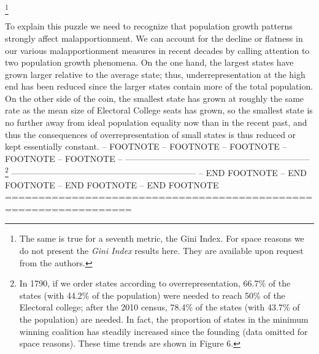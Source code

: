         \footnote{The same is true for a seventh metric, the Gini Index. For space reasons we do not present the \textit{Gini Index} results here. They are available upon request from the authors.}
    
To explain this puzzle we need to recognize that population growth patterns strongly affect malapportionment. We can account for the decline or flatness in our various malapportionment measures in recent decades by calling attention to two population growth phenomena.  On the one hand, the largest states have grown larger relative to the average state; thus, underrepresentation at the high end has been reduced since the larger states contain more of the total population.  On the other side of the coin, the smallest state has grown at roughly the same rate as the mean size of Electoral College seats has grown, so the smallest state is no further away from ideal population equality now than in the recent past, and thus the consequences of overrepresentation of small states is thus reduced or kept essentially constant. 
-- FOOTNOTE -- FOOTNOTE -- FOOTNOTE -- FOOTNOTE -- FOOTNOTE --  %
-----------------------------------------------------------------
    \footnote{In 1790, if we order states according to overrepresentation, 66.7\% of the states (with 44.2\% of the population) were needed to reach 50\% of the Electoral college; after the 2010 census, 78.4\% of the states (with 43.7\% of the population) are needed. In fact, the proportion of states in the minimum winning coalition has steadily increased since the founding (data omitted for space reasons). These time trends are shown in Figure 6.}
-----------------------------------------------------------------
-- END FOOTNOTE -- END FOOTNOTE -- END FOOTNOTE -- END FOOTNOTE %
=================================================================